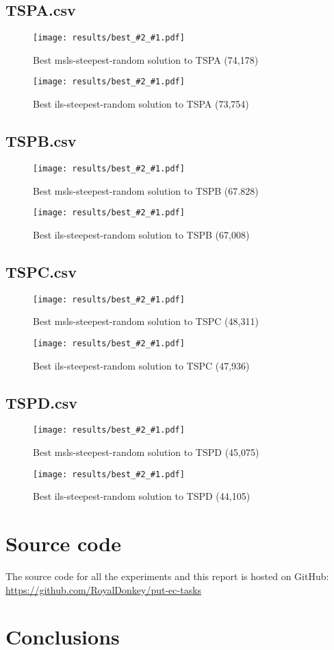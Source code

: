\documentclass[14pt]{article}
\begin{document}
\newcommand{\visualization}[3]{%
\begin{figure}[H]%
	\texttt{[image: results/best\_\#2\_\#1.pdf]}%
	\vspace{-12mm}%
	\caption{Best #2 solution to #1 (#3)}%
\end{figure}%
}

\subsection{TSPA.csv}
\visualization{TSPA}{msls-steepest-random}{74,178}
\visualization{TSPA}{ils-steepest-random}{73,754}

\subsection{TSPB.csv}
\visualization{TSPB}{msls-steepest-random}{67.828}
\visualization{TSPB}{ils-steepest-random}{67,008}

\subsection{TSPC.csv}
\visualization{TSPC}{msls-steepest-random}{48,311}
\visualization{TSPC}{ils-steepest-random}{47,936}

\subsection{TSPD.csv}
\visualization{TSPD}{msls-steepest-random}{45,075}
\visualization{TSPD}{ils-steepest-random}{44,105}

\section{Source code}
The source code for all the experiments and this report is hosted on GitHub: \\
\url{https://github.com/RoyalDonkey/put-ec-tasks}

\section{Conclusions}
\end{document}
